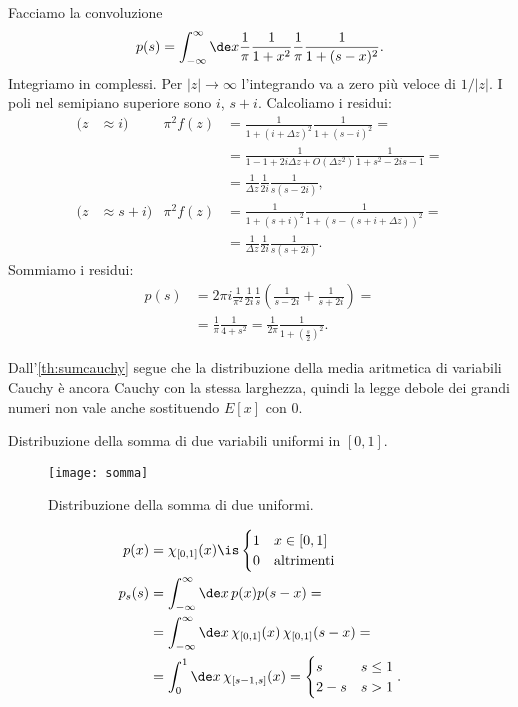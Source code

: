 \begin{solution}
	Facciamo la convoluzione
	\begin{equation*}
		p(s) = \int_{-\infty}^\infty \de x \frac1\pi \frac1{1+x^2} \frac1\pi \frac1{1+(s-x)^2}.
	\end{equation*}
	Integriamo in complessi.
	Per $|z|\to\infty$ l'integrando va a zero più veloce di $1/|z|$.
	I poli nel semipiano superiore sono $i$, $s+i$.
	Calcoliamo i residui:
	\begin{align*}
		(z &\approx i) & \pi^2f(z)
		&= \frac1{1+(i+\Delta z)^2} \frac1{1+(s-i)^2} = \\
		&&&= \frac1{1-1+2i\Delta z+O(\Delta z^2)} \frac1{1+s^2-2is-1} = \\
		&&&= \frac1{\Delta z} \frac1{2i} \frac1{s(s-2i)}, \\
		(z &\approx s+i) & \pi^2f(z)
		&= \frac1{1+(s+i)^2} \frac1{1+(s-(s+i+\Delta z))^2} = \\
		&&&= \frac1{\Delta z} \frac1{2i} \frac1{s(s+2i)}.
	\end{align*}
	Sommiamo i residui:
	\begin{align*}
		p(s) &= 2\pi i \frac1{\pi^2} \frac1{2i}\frac1s\left(\frac1{s-2i}+\frac1{s+2i}\right) = \\
		&= \frac1\pi \frac1{4+s^2} = \frac1{2\pi} \frac1{1+\left(\frac s2\right)^2}.
	\end{align*}
\end{solution}

Dall'\autoref{th:sumcauchy} segue che la distribuzione della media aritmetica di variabili Cauchy è ancora Cauchy con la stessa larghezza,
quindi la legge debole dei grandi numeri non vale anche sostituendo $E[x]$ con $0$.

\begin{ex}
	Distribuzione della somma di due variabili uniformi in $[0,1]$.
\end{ex}

\begin{solution*}
	\begin{figure}
		\centering
		\texttt{[image: somma]}
		\caption{Distribuzione della somma di due uniformi.}
	\end{figure}
	\begin{align*}
		p(x) &= \chi_{[0,1]}(x) \is \begin{cases}
			1 & x \in [0,1] \\
			0 & \text{altrimenti}
		\end{cases} \\
		p_s(s) &= \int_{-\infty}^{\infty}\de x\, p(x)p(s-x) = \\
		&= \int_{-\infty}^{\infty}\de x\, \chi_{[0,1]}(x)\, \chi_{[0,1]}(s-x) = \\
		&= \int_0^1 \de x\, \chi_{[s-1,s]}(x) = \begin{cases}
			s & s\le1 \\
			2-s & s>1
		\end{cases}.
	\end{align*}
\end{solution*}

